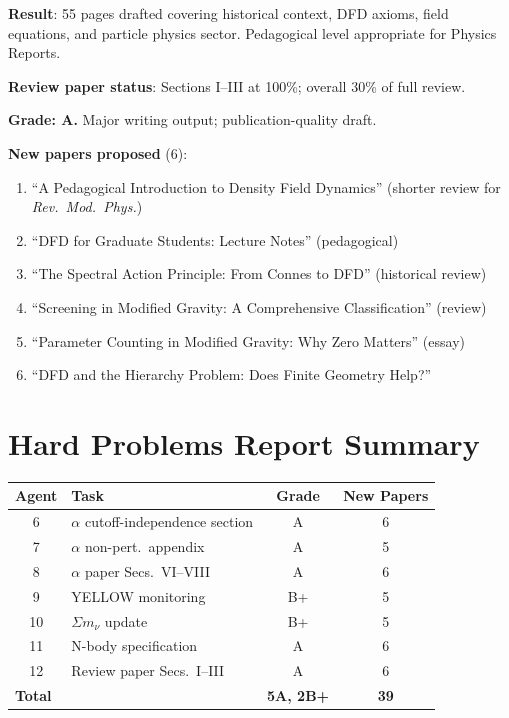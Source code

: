 \documentclass[11pt,a4paper]{article}
\begin{document}
\begin{tcolorbox}[colback=blue!5!white, colframe=blue!60!black, title={Agent 12: Review Paper Sections I--III DRAFTED}]
\textbf{Result}: 55 pages drafted covering historical context, DFD axioms, field equations, and particle physics sector. Pedagogical level appropriate for Physics Reports.

\textbf{Review paper status}: Sections I--III at 100\%; overall 30\% of full review.

\textbf{Grade: A.} Major writing output; publication-quality draft.

\textbf{New papers proposed} (6):
\begin{enumerate}
\item ``A Pedagogical Introduction to Density Field Dynamics'' (shorter review for \textit{Rev.\ Mod.\ Phys.})
\item ``DFD for Graduate Students: Lecture Notes'' (pedagogical)
\item ``The Spectral Action Principle: From Connes to DFD'' (historical review)
\item ``Screening in Modified Gravity: A Comprehensive Classification'' (review)
\item ``Parameter Counting in Modified Gravity: Why Zero Matters'' (essay)
\item ``DFD and the Hierarchy Problem: Does Finite Geometry Help?''
\end{enumerate}
\end{tcolorbox}


\section*{Hard Problems Report Summary}

\begin{center}
\begin{tabular}{clcc}
\toprule
\textbf{Agent} & \textbf{Task} & \textbf{Grade} & \textbf{New Papers} \\
\midrule
6 & $\alpha$ cutoff-independence section & A & 6 \\
7 & $\alpha$ non-pert.\ appendix & A & 5 \\
8 & $\alpha$ paper Secs.\ VI--VIII & A & 6 \\
9 & YELLOW monitoring & B+ & 5 \\
10 & $\Sigma m_\nu$ update & B+ & 5 \\
11 & N-body specification & A & 6 \\
12 & Review paper Secs.\ I--III & A & 6 \\
\midrule
\multicolumn{2}{l}{\textbf{Total}} & \textbf{5A, 2B+} & \textbf{39} \\
\bottomrule
\end{tabular}
\end{center}
\end{document}
